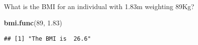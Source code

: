 \documentclass[
]{book}
\newenvironment{Shaded}{\begin{snugshade}}{\end{snugshade}}
\newcommand{\DecValTok}[1]{\textcolor[rgb]{0.00,0.00,0.81}{#1}}
\newcommand{\FloatTok}[1]{\textcolor[rgb]{0.00,0.00,0.81}{#1}}
\newcommand{\FunctionTok}[1]{\textcolor[rgb]{0.13,0.29,0.53}{\textbf{#1}}}
\newcommand{\NormalTok}[1]{#1}
\begin{document}
What is the BMI for an individual with 1.83m weighting 89Kg?

\begin{Shaded}
\begin{Highlighting}[]
\FunctionTok{bmi.func}\NormalTok{(}\DecValTok{89}\NormalTok{, }\FloatTok{1.83}\NormalTok{)}
\end{Highlighting}
\end{Shaded}

\begin{verbatim}
## [1] "The BMI is  26.6"
\end{verbatim}
\end{document}
